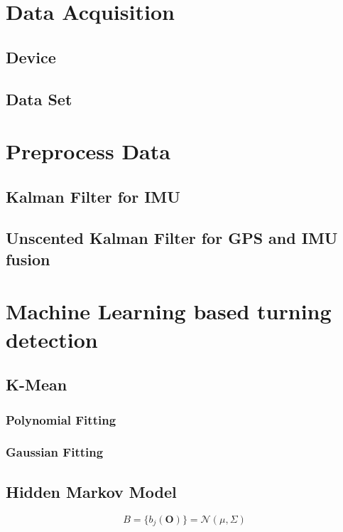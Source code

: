 \documentclass{article}
\begin{document}
\section{Data Acquisition}
\subsection{Device}

\subsection{Data Set}

\section{Preprocess Data}
\subsection{Kalman Filter for IMU}

\subsection{Unscented Kalman Filter for GPS and IMU fusion}

\section{Machine Learning based turning detection}

\subsection{K-Mean}

\subsubsection{Polynomial Fitting}

\subsubsection{Gaussian Fitting}

\subsection{Hidden Markov Model}

\begin{equation}
B = \{ b_j(\textbf{O})\} = \mathcal{N} (\mu, \Sigma)
\end{equation}
\end{document}
